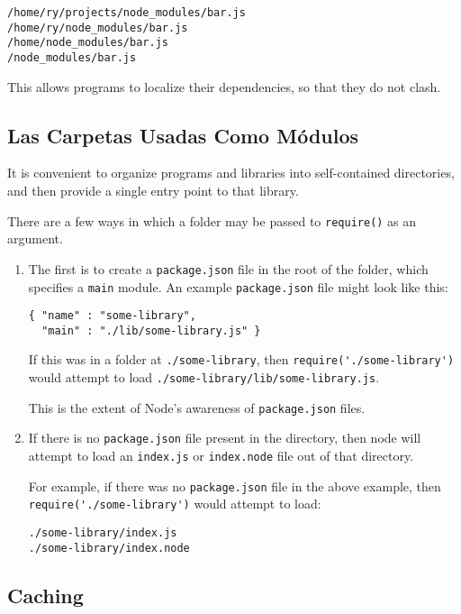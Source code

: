 \begin{verbatim}
/home/ry/projects/node_modules/bar.js
/home/ry/node_modules/bar.js
/home/node_modules/bar.js
/node_modules/bar.js
\end{verbatim}

This allows programs to localize their dependencies, so that they do not clash.

\subsection{Las Carpetas Usadas Como Módulos}
It is convenient to organize programs and libraries into self-contained
directories, and then provide a single entry point to that library. 

There
are a few ways in which a folder may be passed to \verb|require()| as an
argument.

\begin{enumerate}
\item
The first is to create a \verb|package.json| file in the root of the
folder, which specifies a \verb|main| module. 
An example \verb|package.json| file
might look like this:

\begin{verbatim}
{ "name" : "some-library",
  "main" : "./lib/some-library.js" }
\end{verbatim}

If this was in a folder at 
\verb|./some-library|, then \verb|require('./some-library')| would attempt
to load \verb|./some-library/lib/some-library.js|.

This is the extent of Node's awareness of \verb|package.json| files.

\item
If there is no \verb|package.json| 
file present in the directory, then node will
attempt to load an 
\verb|index.js| or
\verb|index.node| 
file out of that directory. 

For
example, if there was no 
\verb|package.json| file in the above example, then
\verb|require('./some-library')| would attempt to load:

\begin{verbatim}
./some-library/index.js
./some-library/index.node
\end{verbatim}

\end{enumerate}

\subsection{Caching}

